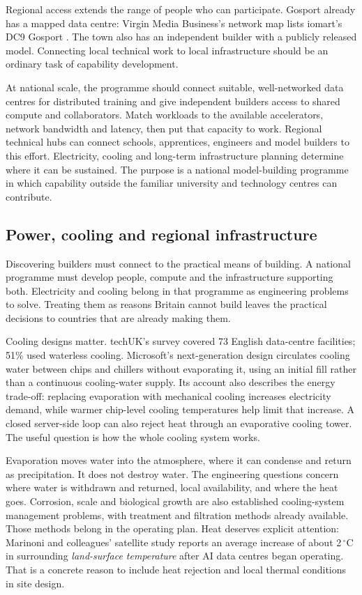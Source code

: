 \documentclass[11pt,a4paper]{article}
\begin{document}
Regional access extends the range of people who can participate. Gosport
already has a mapped data centre: Virgin Media Business's network map
lists iomart's DC9 Gosport \cite{vmbnetwork}. The town also has an
independent builder with a publicly released model. Connecting local
technical work to local infrastructure should be an ordinary task of
capability development.

At national scale, the programme should connect suitable, well-networked
data centres for distributed training and give independent builders access
to shared compute and collaborators. Match workloads to the available
accelerators, network bandwidth and latency, then put that capacity to
work. Regional technical hubs can connect schools, apprentices, engineers
and model builders to this effort. Electricity, cooling and long-term
infrastructure planning determine where it can be sustained. The purpose
is a national model-building programme in which capability outside the
familiar university and technology centres can contribute.

\subsection{Power, cooling and regional infrastructure}
Discovering builders must connect to the practical means of building. A national programme must develop people, compute and the infrastructure supporting both. Electricity and cooling belong in that programme as engineering problems to solve. Treating them as reasons Britain cannot build leaves the practical decisions to countries that are already making them.

Cooling designs matter. techUK's survey covered 73 English data-centre facilities; 51\% used waterless cooling. Microsoft's next-generation design circulates cooling water between chips and chillers without evaporating it, using an initial fill rather than a continuous cooling-water supply. Its account also describes the energy trade-off: replacing evaporation with mechanical cooling increases electricity demand, while warmer chip-level cooling temperatures help limit that increase. A closed server-side loop can also reject heat through an evaporative cooling tower. The useful question is how the whole cooling system works. \cite{infraTechukWater,infraMicrosoftCooling,infraDOECooling}

Evaporation moves water into the atmosphere, where it can condense and return as precipitation. It does not destroy water. The engineering questions concern where water is withdrawn and returned, local availability, and where the heat goes. Corrosion, scale and biological growth are also established cooling-system management problems, with treatment and filtration methods already available. Those methods belong in the operating plan. Heat deserves explicit attention: Marinoni and colleagues' satellite study reports an average increase of about 2\,$^{\circ}$C in surrounding \emph{land-surface temperature} after AI data centres began operating. That is a concrete reason to include heat rejection and local thermal conditions in site design. \cite{infraUSGSWater,infraDOECooling,infraDataHeat}
\end{document}
